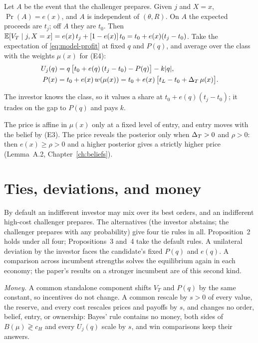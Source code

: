 \begin{derivation}
Let \(A\) be the event that the challenger prepares. Given \(j\) and \(X=x\), \(\Pr(A)=e(x)\), and \(A\) is independent of \((\theta,R)\). On \(A\) the expected proceeds are \(t_j\); off \(A\) they are \(t_0\). Then \(\mathbb{E}[V_T\mid j,X=x]=e(x)\,t_j+[1-e(x)]\,t_0=t_0+e(x)(t_j-t_0)\). Take the expectation of \eqref{eq:model-profit} at fixed \(q\) and \(P(q)\), and average over the class with the weights \(\mu(x)\) for (E4):
\begin{align}
U_j(q)&=q\,\bigl[t_0+e(q)\,(t_j-t_0)-P(q)\bigr]-k|q|,\notag\\
P(x)&=t_0+e(x)\,w(\mu(x))=t_0+e(x)\,\bigl[t_L-t_0+\Delta_T\,\mu(x)\bigr].\label{eq:model-price}
\end{align}
\end{derivation}
The investor knows the class, so it values a share at \(t_0+e(q)(t_j-t_0)\); it trades on the gap to \(P(q)\) and pays \(k\).

The price is affine in \(\mu(x)\) only at a fixed level of entry, and entry moves with the belief by (E3).
The price reveals the posterior only when \(\Delta_T>0\) and \(\rho>0\): then \(e(x)\ge\rho>0\) and a higher posterior gives a strictly higher price (Lemma~A.2, Chapter~\ref{ch:beliefs}).

\section{Ties, deviations, and money}\label{sec:model-ties}

By default an indifferent investor may mix over its best orders, and an indifferent high-cost challenger prepares.
The alternatives (the investor abstains; the challenger prepares with any probability) give four tie rules in all.
Proposition~2 holds under all four; Propositions~3 and~4 take the default rules.
A unilateral deviation by the investor faces the candidate's fixed \(P(q)\) and \(e(q)\).
A comparison across incumbent strengths solves the equilibrium again in each economy; the paper's results on a stronger incumbent are of this second kind.

\emph{Money.} A common standalone component shifts \(V_T\) and \(P(q)\) by the same constant, so incentives do not change.
A common rescale by \(s>0\) of every value, the reserve, and every cost rescales prices and payoffs by \(s\), and changes no order, belief, entry, or ownership:
Bayes' rule contains no money, both sides of \(B(\mu)\gtrless c_H\) and every \(U_j(q)\) scale by \(s\), and win comparisons keep their answers.

